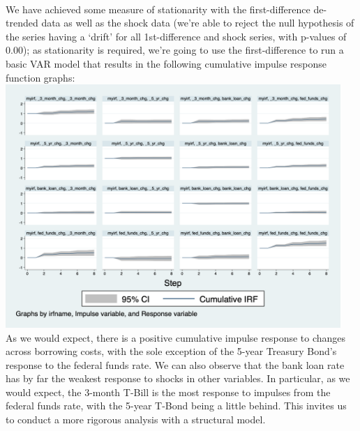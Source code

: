 \documentclass[12pt,final]{article}
\begin{document}
 \\
We have achieved some measure of stationarity with the first-difference de-trended data as well as the shock data (we're able to reject the null hypothesis of the series having a `drift' for all 1st-difference and shock series, with p-values of 0.00); as stationarity is required, we're going to use the first-difference to run a basic VAR model that results in the following cumulative impulse response function graphs: \\
\includegraphics[width=5in]{var_basic.png} \\
As we would expect, there is a positive cumulative impulse response to changes across borrowing costs, with the sole exception of the 5-year Treasury Bond's response to the federal funds rate. We can also observe that the bank loan rate has by far the weakest response to shocks in other variables. In particular, as we would expect, the 3-month T-Bill is the most response to impulses from the federal funds rate, with the 5-year T-Bond being a little behind. This invites us to conduct a more rigorous analysis with a structural model.
\end{document}

